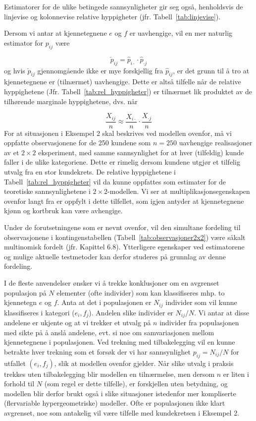 Estimatorer for de ulike betingede sannsynligheter gir seg også,
henholdsvis de linjevise og kolonnevise relative hyppigheter (jfr. Tabell~\ref{tab:linjevise}). 

Dersom vi antar at kjennetegnene $e$ og $f$ er uavhengige, vil en mer
naturlig estimator for $p_{ij}$ være

\[ \check{p}_{ij}=\hat{p}_{i\cdot}\cdot \hat{p}_{\cdot j} \]
og hvis $\check{p}_{ij}$ gjennomgående ikke er mye forskjellig fra
$\hat{p}_{ij}$, er det grunn til å tro at kjennetegnene er (tilnærmet)
uavhengige. Dette er altså tilfelle når de relative hyppighetene
(Jfr. Tabell~\ref{tab:rel_hyppigheter}) er tilnærmet lik produktet av de tilhørende marginale
hyppighetene, dvs. når

\[  \frac{X_{ij}}{n}\approx \frac{X_{i\cdot}}{n}\cdot \frac{X_{\cdot j}}{n} \]
For at situasjonen i Eksempel 2 skal beskrives ved  modellen ovenfor, må vi
oppfatte observasjonene for de 250 kundene som $n=250$ uavhengige rea\-lisasjoner
av et $2\times 2$ eksperiment, med samme sannsynlighet for at hver (tilfeldig)
kunde faller i de ulike kategoriene. Dette er rimelig dersom kundene utgjør
et tilfelig utvalg fra en stor kundekrets.
De relative hyppighetene i Tabell~\ref{tab:rel_hyppigheter} vil da kunne oppfattes som estimater for
de teoretiske sannsynlighetene i $2\times 2$-modellen. Vi ser at
multiplikasjonsegenskapen ovenfor langt fra er oppfylt i dette tilfellet,
som igjen antyder at kjennetegnene kjønn og kortbruk kan være avhengige.

Under de forutsetningene som er nevnt ovenfor, vil den simultane fordeling
til observasjonene i kontingenstabellen (Tabell~\ref{tab:observasjoner2x2}) være såkalt
multinomisk fordelt (jfr. Kapittel 6.8).  Ytterligere egenskaper ved
estimatorene og mulige aktuelle testmetoder kan derfor studeres på
grunnlag av denne fordeling.

I de fleste anvendelser ønsker vi å
trekke konklusjoner om en avgrenset populasjon på $N$ elementer
(ofte individer) som kan klassifiseres mhp. to kjennetegn $e$ og $f$.
Anta at det i populasjonen er $N_{ij}$ individer som vil kunne 
klassifiseres i kategori ($e_i, f_j$).  Andelen slike individer er
$N_{ij}/N$.  Vi antar at disse andelene er ukjente og at vi trekker et
utvalg på $n$ individer fra populasjonen med sikte på å
anslå andelene, evt. si noe om samvariasjonen mellom
kjennetegnene i populasjonen.  Ved trekning med tilbakelegging vil en 
kunne betrakte hver trekning som et forsøk der vi har sannsynlighet
$p_{ij} = N_{ij}/N$ for utfallet $(e_i, f_j)$, slik at modellen ovenfor
gjelder.  Når slike utvalg i praksis trekkes uten tilbakelegging 
blir modellen en tilnærmelse, men dersom $n$ er liten i forhold til $N$ 
(som regel er dette tilfelle), er forskjellen uten betydning, og modellen
blir derfor brukt også i slike situasjoner istedenfor mer 
kompliserte (flervariable hypergeometriske) modeller. Ofte er populasjonen
ikke klart avgrenset, noe som antakelig vil være tilfelle med kundekretsen
i Eksempel 2. \\


